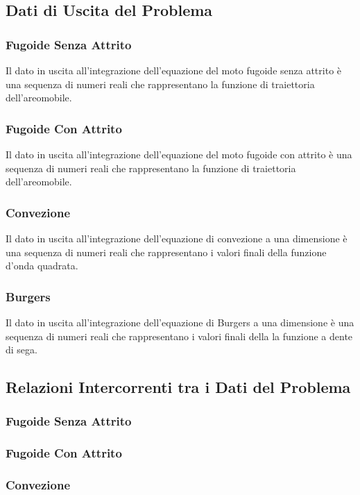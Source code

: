 \documentclass{article}
\begin{document}
\subsection{Dati di Uscita del Problema}

    \subsubsection*{Fugoide Senza Attrito}
    Il dato in uscita all'integrazione dell'equazione del moto fugoide senza attrito è una sequenza di numeri reali che rappresentano la funzione di traiettoria dell'areomobile.
    \subsubsection*{Fugoide Con Attrito}
    Il dato in uscita all'integrazione dell'equazione del moto fugoide con attrito è una sequenza di numeri reali che rappresentano la funzione di traiettoria dell'areomobile.
    \subsubsection*{Convezione}
    Il dato in uscita all'integrazione dell'equazione di convezione a una dimensione è una sequenza di numeri reali che rappresentano i valori finali della funzione d'onda quadrata.
    \subsubsection*{Burgers}
    Il dato in uscita all'integrazione dell'equazione di Burgers a una dimensione è una sequenza di numeri reali che rappresentano i valori finali della la funzione a dente di sega.
\subsection{Relazioni Intercorrenti tra i Dati del Problema}

    \subsubsection*{Fugoide Senza Attrito}
    
    \newpage
    \subsubsection*{Fugoide Con Attrito}
    
    \newpage
    \subsubsection*{Convezione}
    
    \newpage
\end{document}
